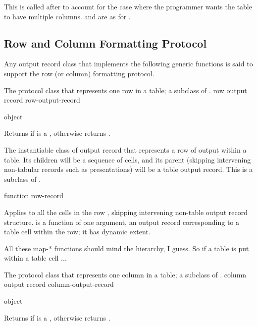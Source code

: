 This is called after  to account for the case where the
programmer wants the table to have multiple columns.   and
 are as for .


\subsection {Row and Column Formatting Protocol}

Any output record class that implements the following generic functions is said
to support the row (or column) formatting protocol.


The protocol class that represents one row in a table; a subclass of
.
 {row output record} {row-output-record}

 {object}

Returns  if  is a , otherwise
returns .


The instantiable class of output record that represents a row of output within a
table.  Its children will be a sequence of cells, and its parent (skipping
intervening non-tabular records such as presentations) will be a table output
record.  This is a subclass of .

 {function row-record}

Applies  to all the cells in the row , skipping
intervening non-table output record structure.   is a function of
one argument, an output record corresponding to a table cell within the row; it
has dynamic extent.

 {All these map-* functions should mind the hierarchy, I guess. So if a table is put within a table cell ...}


The protocol class that represents one column in a table; a subclass of
.
 {column output record} {column-output-record}

 {object}

Returns  if  is a , otherwise
returns .

